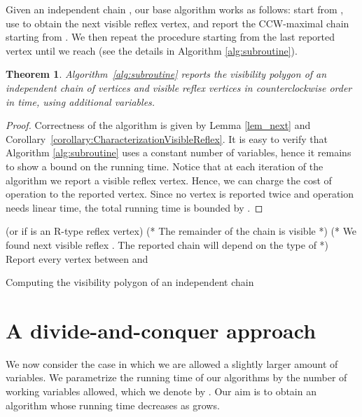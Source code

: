 \documentclass[a4paper]{article}
\newtheorem{theorem}{Theorem}
\begin{document}
Given an  independent chain , our base algorithm works as follows: start from , use  to obtain the next visible reflex vertex, and report the CCW-maximal chain starting from . We then repeat the procedure starting from the last reported vertex until we reach  (see the details in Algorithm \ref{alg:subroutine}). 


\begin{theorem}\label{theo:Sequential algorithm}
Algorithm~\ref{alg:subroutine} reports the visibility polygon of an independent chain of  vertices and  visible reflex vertices in counterclockwise order in  time, using  additional variables.
\end{theorem}
\begin{proof}
Correctness of the algorithm is given by Lemma \ref{lem_next} and Corollary~\ref{corollary:CharacterizationVisibleReflex}.  It is easy to verify that Algorithm \ref{alg:subroutine} uses a constant number of variables, hence it remains to show a bound on the running time. Notice that at each iteration of the algorithm we report a visible reflex vertex. Hence, we can charge the cost of  operation to the reported vertex. Since no vertex is reported twice and operation  needs linear time, the total running time is bounded by . 
\end{proof}

\begin{algorithm}
  \begin{algorithmic}[1]  
	\STATE   (or  if  is an R-type reflex vertex)
	\REPEAT
		\STATE 
		\IF{}
			\STATE  (*  The remainder of the chain is visible *)
			\STATE 
			\STATE 
		\ELSE 
		        \STATE (* We found next visible reflex . The reported chain will depend on the type of  *)
				\STATE 
				\STATE 
			\ELSE
				\STATE 
				\STATE 
			\ENDIF
		\ENDIF
    \STATE Report every vertex between  and 
    \STATE 
    \UNTIL{}
  \end{algorithmic}
\caption{Computing the visibility polygon of an independent chain }
\label{alg:subroutine}
\end{algorithm}

\section{A divide-and-conquer approach}\label{Section:Divide and conquer}


We now consider the case in which we are allowed a slightly larger amount of variables. We parametrize the running time of our algorithms by the number of working variables allowed, which we denote by . Our aim is to obtain an algorithm whose running time decreases as  grows. 
\end{document}
